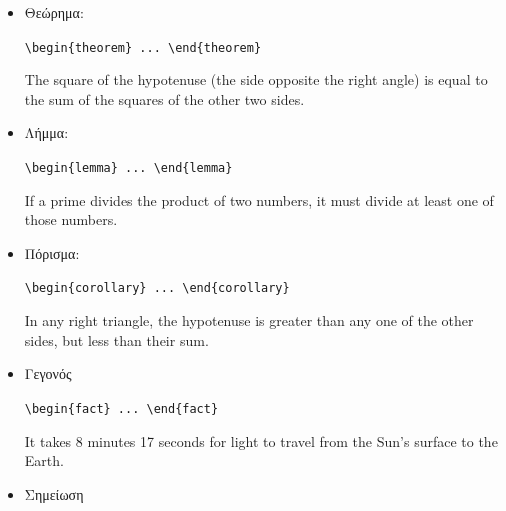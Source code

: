 \begin{itemize}
	\item Θεώρημα:

	\begin{center}\verb|\begin{theorem} ... \end{theorem}|\end{center}

	\begin{theorem}
	Τhe square of the hypotenuse (the side opposite the right angle)
	is equal to the sum of the squares of the other two sides.
	\end{theorem}

	\item Λήμμα:

	\begin{center}\verb|\begin{lemma} ... \end{lemma}|\end{center}

	\begin{lemma}
	If a prime divides the product of two numbers, it must divide at least
	one of those numbers.
	\end{lemma}
	
	\item Πόρισμα:

	\begin{center}\verb|\begin{corollary} ... \end{corollary}|\end{center}
	
	\begin{corollary}
	In any right triangle, the hypotenuse is greater than any one of the
	other sides, but less than their sum.
	\end{corollary}
	
	\item Γεγονός
	
	\begin{center}\verb|\begin{fact} ... \end{fact}|\end{center}
	
	\begin{fact}
	It takes 8 minutes 17 seconds for light to travel from the Sun’s surface
	to the Earth.
	\end{fact}
	
	\item Σημείωση
	

\end{itemize}

